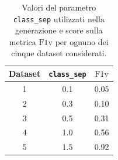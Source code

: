 \begin{table}[h]
    \centering
    \begin{tabular}{|c|c|c|}
        \hline
        Dataset & \texttt{class\_sep} & $\mathrm{F1v}$ \\
        \hline
        1 & 0.1 & 0.05 \\
        2 & 0.3 & 0.10 \\
        3 & 0.5 & 0.31 \\
        4 & 1.0 & 0.56 \\
        5 & 1.5 & 0.92 \\
        \hline
    \end{tabular}
    \caption{Valori del parametro \texttt{class\_sep} utilizzati nella generazione e score sulla metrica $\mathrm{F1v}$ per ognuno dei cinque dataset considerati.}
    \label{tab:datasets}
\end{table}


